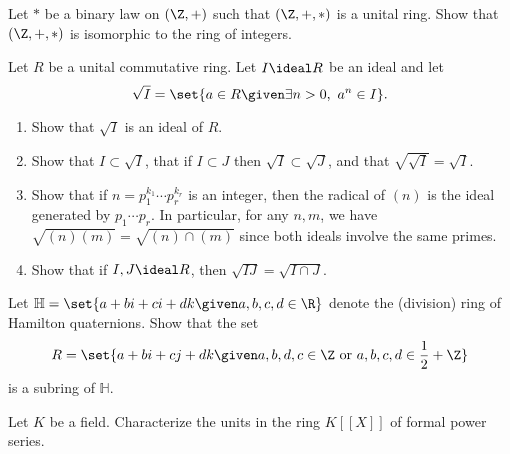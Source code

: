 \begin{problem}
Let \( * \) be a binary law on \( (\Z, +) \) such that \( (\Z, +, *) \) is a unital ring.
Show that \( (\Z, +, *) \) is isomorphic to the ring of integers.
\end{problem}

\begin{problem}
Let \( R \) be a unital commutative ring.
Let \( I \ideal R \) be an ideal and let
\[ \sqrt I = \set{a \in R \given \exists n > 0,\ a^n \in I}. \]
\begin{enumerate}[1]
\item
Show that \( \sqrt I \) is an ideal of \( R \).
\item
Show that \( I \subset \sqrt I \), that if \( I \subset J \) then \( \sqrt I \subset \sqrt J \), and that \( \sqrt{\sqrt I} = \sqrt I \).
\item
Show that if \( n = p_1^{k_1} \cdots p_r^{k_r} \) is an integer, then the radical of \( (n) \) is the ideal generated by \( p_1 \cdots p_r \).
In particular, for any \( n, m \), we have \( \sqrt{(n)(m)} = \sqrt{(n) \cap (m)} \) since both ideals involve the same primes.
\item
Show that if \( I, J \ideal R \), then \( \sqrt{IJ} = \sqrt{I \cap J} \).
\end{enumerate}
\end{problem}

\begin{problem}
Let \( \mathbb H = \set{a + bi + ci + dk \given a, b, c, d \in \R} \) denote the (division) ring of Hamilton quaternions.
Show that the set
\[ R = \set{a + bi + cj + dk \given a,b,d,c \in \Z \text{ or } a,b,c,d \in \frac 1 2 + \Z} \]
is a subring of \( \mathbb H \).
\end{problem}

\begin{problem}
Let \( K \) be a field.
Characterize the units in the ring \( K[[X]] \) of formal power series.
\end{problem}
